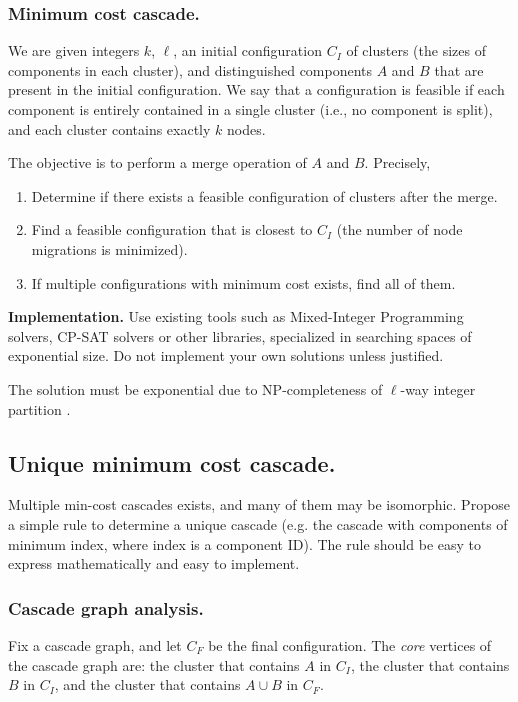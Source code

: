 \documentclass[a4paper,USenglish]{lipics-v2019}
\begin{document}
\subsubsection{Minimum cost cascade.}

We are given integers $k$, $\ell$, an initial configuration $C_I$ of clusters (the
sizes of components in each cluster), and distinguished components $A$ and
$B$ that are present in the initial configuration.
We say that a configuration is feasible if each component is entirely contained
in a single cluster (i.e., no component is split), and each cluster contains
exactly $k$ nodes.

The objective is to perform a merge operation of $A$ and $B$. Precisely,
\begin{enumerate}
    \item Determine if there exists a feasible configuration of clusters after
        the merge.
    \item Find a feasible configuration that is closest to $C_I$ (the number of
        node migrations is minimized).
    \item If multiple configurations with minimum cost exists, find all of them.
\end{enumerate}

\noindent
\textbf{Implementation.}
Use existing tools such as Mixed-Integer Programming solvers, CP-SAT solvers or
other libraries, specialized in searching spaces of exponential size.
Do not implement your own solutions unless justified.

\noindent The solution must be exponential due to NP-completeness of $\ell$-way integer
partition \cite{AndRae06}.
\subsection{Unique minimum cost cascade.}
Multiple min-cost cascades exists, and many of them may be isomorphic. Propose a
simple rule to determine a unique cascade (e.g. the cascade with components of
minimum index, where index is a component ID). The rule should be easy to
express mathematically and easy to implement.

\subsubsection{Cascade graph analysis.}

Fix a cascade graph, and let $C_F$ be the final configuration.
The \emph{core} vertices of the cascade graph are: the cluster that contains $A$
in $C_I$, the cluster that contains $B$ in $C_I$, and the cluster that contains
$A\cup B$ in $C_F$.
\end{document}
